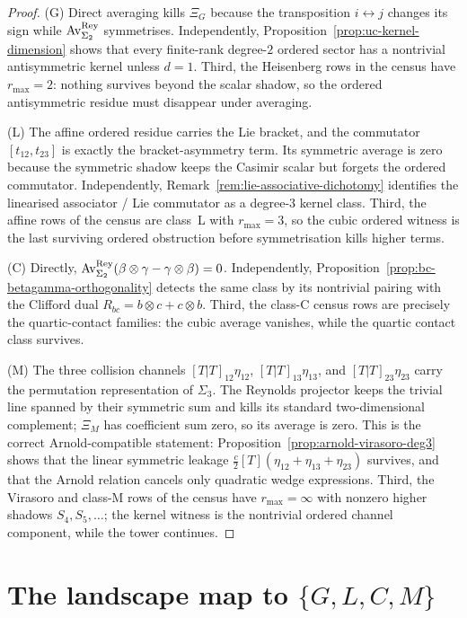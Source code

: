 \begin{proof}
\textup{(G)} Direct averaging kills $\Xi_G$ because the transposition
$i\leftrightarrow j$ changes its sign while
$\operatorname{Av}^{\mathrm{Rey}}_{\Sigma_2}$ symmetrises. Independently,
Proposition~\ref{prop:uc-kernel-dimension} shows that every
finite-rank degree-$2$ ordered sector has a nontrivial antisymmetric
kernel unless $d=1$. Third, the Heisenberg rows in the census have
$r_{\max}=2$: nothing survives beyond the scalar shadow, so the ordered
antisymmetric residue must disappear under averaging.

\textup{(L)} The affine ordered residue carries the Lie bracket, and
the commutator $[t_{12},t_{23}]$ is exactly the bracket-asymmetry term.
Its symmetric average is zero because the symmetric shadow keeps the
Casimir scalar but forgets the ordered commutator. Independently,
Remark~\ref{rem:lie-associative-dichotomy} identifies the linearised
associator / Lie commutator as a degree-$3$ kernel class. Third, the
affine rows of the census are class~L with $r_{\max}=3$, so the cubic
ordered witness is the last surviving ordered obstruction before
symmetrisation kills higher terms.

\textup{(C)} Directly,
$\operatorname{Av}^{\mathrm{Rey}}_{\Sigma_2}(\beta\otimes\gamma-\gamma\otimes\beta)=0$.
Independently, Proposition~\ref{prop:bc-betagamma-orthogonality}
detects the same class by its nontrivial pairing with the Clifford dual
$R_{bc}=b\otimes c+c\otimes b$. Third, the class-C census rows are
precisely the quartic-contact families: the cubic average vanishes,
while the quartic contact class survives.

\textup{(M)} The three collision channels
$[T|T]_{12}\eta_{12}$, $[T|T]_{13}\eta_{13}$, and
$[T|T]_{23}\eta_{23}$ carry the permutation representation of
$\Sigma_3$. The Reynolds projector keeps the trivial line spanned by
their symmetric sum and kills its standard two-dimensional complement;
$\Xi_M$ has coefficient sum zero, so its average is zero. This is the
correct Arnold-compatible statement: Proposition~\ref{prop:arnold-virasoro-deg3}
shows that the linear symmetric leakage
$\frac c2[T](\eta_{12}+\eta_{13}+\eta_{23})$ survives, and that the
Arnold relation cancels only quadratic wedge expressions. Third, the
Virasoro and class-M rows of the census have $r_{\max}=\infty$ with
nonzero higher shadows $S_4,S_5,\dots$; the kernel witness is the
nontrivial ordered channel component, while the tower continues.
\end{proof}

\section{The landscape map to \texorpdfstring{$\{G,L,C,M\}$}{G/L/C/M}}
\label{sec:uc-landscape-map}

